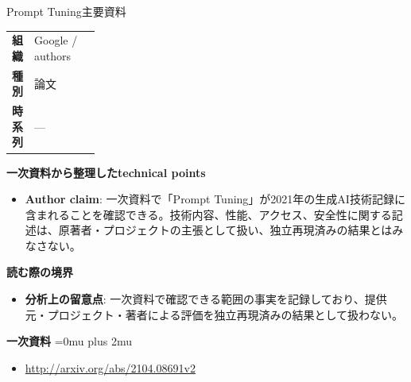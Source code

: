 \begin{technicalnote}{Prompt Tuning}{主要資料}
\begingroup
\begin{tabularx}{\linewidth}{@{}>{\bfseries}p{0.22\linewidth}X@{}}
組織 & Google / authors \\
種別 & 論文 \\
時系列 & — \\
\end{tabularx}
\smallskip
{\bfseries 一次資料から整理したtechnical points}
\begin{itemize}[leftmargin=1.5em,itemsep=0.35em]
\item \textbf{Author claim}: 一次資料で「Prompt Tuning」が2021年の生成AI技術記録に含まれることを確認できる。技術内容、性能、アクセス、安全性に関する記述は、原著者・プロジェクトの主張として扱い、独立再現済みの結果とはみなさない。
\end{itemize}
\begin{minipage}{\linewidth}
{\bfseries 読む際の境界}
\begin{itemize}[leftmargin=1.5em,itemsep=0.35em]
\item \textbf{分析上の留意点}: 一次資料で確認できる範囲の事実を記録しており、提供元・プロジェクト・著者による評価を独立再現済みの結果として扱わない。
\end{itemize}
\begin{samepage}
{\bfseries 一次資料}
\begingroup\sloppy
\Urlmuskip=0mu plus 2mu\relax
\begin{itemize}[leftmargin=1.5em,itemsep=0.25em]
\item {\scriptsize\url{http://arxiv.org/abs/2104.08691v2}}
\end{itemize}
\endgroup
\end{samepage}
\end{minipage}
\endgroup
\end{technicalnote}
\medskip

